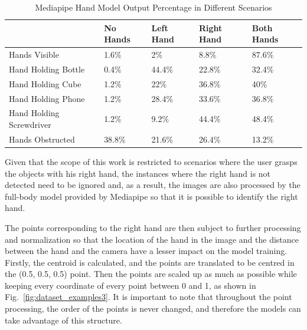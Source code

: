 \begin{table}[H]
    \centering
    \caption{Mediapipe Hand Model Output Percentage in Different Scenarios}
    \label{table:mediapipe_metrics}
    \begin{tabular}{|l|l|l|l|l|}
        \hline
        & No Hands & Left Hand & Right Hand & Both Hands \\
        \hline
        Hands Visible & 1.6\% & 2\% & 8.8\% & 87.6\% \\
        \hline
        Hand Holding Bottle & 0.4\% & 44.4\% & 22.8\% & 32.4\% \\
        \hline
        Hand Holding Cube & 1.2\% & 22\% & 36.8\% & 40\% \\
        \hline
        Hand Holding Phone & 1.2\% & 28.4\% & 33.6\% & 36.8\% \\
        \hline
        Hand Holding Screwdriver & 1.2\% & 9.2\% & 44.4\% & 48.4\% \\
        \hline
        Hands Obstructed & 38.8\% & 21.6\% & 26.4\% & 13.2\% \\
        \hline
    \end{tabular}
\end{table}

Given that the scope of this work is restricted to scenarios where the user grasps the objects with his right hand, the instances where the right hand is not detected need to be ignored and, as a result, the images are also processed by the full-body model provided by Mediapipe so that it is possible to identify the right hand.

The points corresponding to the right hand are then subject to further processing and normalization so that the location of the hand in the image and the distance between the hand and the camera have a lesser impact on the model training. Firstly, the centroid is calculated, and the points are translated to be centred in the (0.5, 0.5, 0.5) point. Then the points are scaled up as much as possible while keeping every coordinate of every point between 0 and 1, as shown in Fig.~\ref{fig:dataset_examples3}. It is important to note that throughout the point processing, the order of the points is never changed, and therefore the models can take advantage of this structure.

